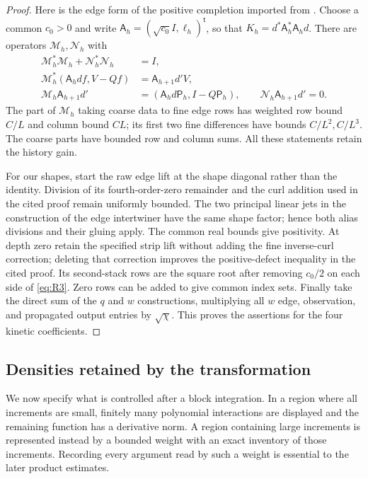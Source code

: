\begin{proof}
Here is the edge form of the positive completion imported from
\cite[Lemma ``Positive completion of the block transformation'']{SharpO4}.
Choose a common $c_0>0$ and write
$\mathsf A_h=(\sqrt{c_0}I,\ell_h)^\mathsf t$, so that
$K_h=d^*\mathsf A_h^*\mathsf A_hd$.  There are operators
$\mathcal M_h,\mathcal N_h$ with
\begin{align}
 \mathcal M_h^*\mathcal M_h+\mathcal N_h^*\mathcal N_h&=I,\nonumber\\
 \mathcal M_h^*(\mathsf A_hdf,V-Qf)&=\mathsf A_{h+1}d'V,\nonumber\\
 \mathcal M_h\mathsf A_{h+1}d'
       &=(\mathsf A_hd\mathsf P_h,I-Q\mathsf P_h),\qquad
 \mathcal N_h\mathsf A_{h+1}d'=0.
 \label{eq:rg-positive-completion}
\end{align}
The part of $\mathcal M_h$ taking coarse data to fine edge rows has
weighted row bound $C/L$ and column bound $CL$; its first two fine
differences have bounds $C/L^2,C/L^3$.  The coarse parts have bounded
row and column sums.  All these statements retain the history gain.

For our shapes, start the raw edge lift at the shape diagonal rather
than the identity.  Division of its fourth-order-zero remainder and
the curl addition used in the cited proof remain uniformly bounded.
The two principal linear jets in the construction of the edge
intertwiner have the same shape factor; hence both alias divisions
and their gluing apply.  The common real bounds give positivity.
At depth zero retain the specified strip lift without adding the fine
inverse-curl correction; deleting that correction improves the
positive-defect inequality in the cited proof.  Its second-stack rows
are the square root after removing $c_0/2$ on each side of
\eqref{eq:R3}.  Zero rows can be added to give common index sets.
Finally take the direct sum of the $q$ and $w$ constructions, multiplying
all $w$ edge, observation, and propagated output entries by
$\sqrt\chi$.  This proves the assertions for the four kinetic
coefficients.
\end{proof}

\subsection{Densities retained by the transformation}

We now specify what is controlled after a block integration.  In a region
where all increments are small, finitely many polynomial interactions
are displayed and the remaining function has a derivative norm.  A
region containing large increments is represented instead by a bounded
weight with an exact inventory of those increments.  Recording every
argument read by such a weight is essential to the later product
estimates.

